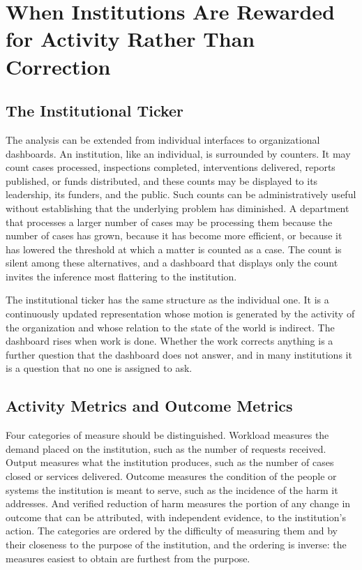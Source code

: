 \documentclass[11pt]{report}
\theoremstyle{definition}
\theoremstyle{remark}
\begin{document}
\chapter{When Institutions Are Rewarded for Activity Rather Than Correction}

\section{The Institutional Ticker}

The analysis can be extended from individual interfaces to organizational dashboards. An institution, like an individual, is surrounded by counters. It may count cases processed, inspections completed, interventions delivered, reports published, or funds distributed, and these counts may be displayed to its leadership, its funders, and the public. Such counts can be administratively useful without establishing that the underlying problem has diminished. A department that processes a larger number of cases may be processing them because the number of cases has grown, because it has become more efficient, or because it has lowered the threshold at which a matter is counted as a case. The count is silent among these alternatives, and a dashboard that displays only the count invites the inference most flattering to the institution.

The institutional ticker has the same structure as the individual one. It is a continuously updated representation whose motion is generated by the activity of the organization and whose relation to the state of the world is indirect. The dashboard rises when work is done. Whether the work corrects anything is a further question that the dashboard does not answer, and in many institutions it is a question that no one is assigned to ask.

\section{Activity Metrics and Outcome Metrics}

Four categories of measure should be distinguished. Workload measures the demand placed on the institution, such as the number of requests received. Output measures what the institution produces, such as the number of cases closed or services delivered. Outcome measures the condition of the people or systems the institution is meant to serve, such as the incidence of the harm it addresses. And verified reduction of harm measures the portion of any change in outcome that can be attributed, with independent evidence, to the institution's action. The categories are ordered by the difficulty of measuring them and by their closeness to the purpose of the institution, and the ordering is inverse: the measures easiest to obtain are furthest from the purpose.
\end{document}
